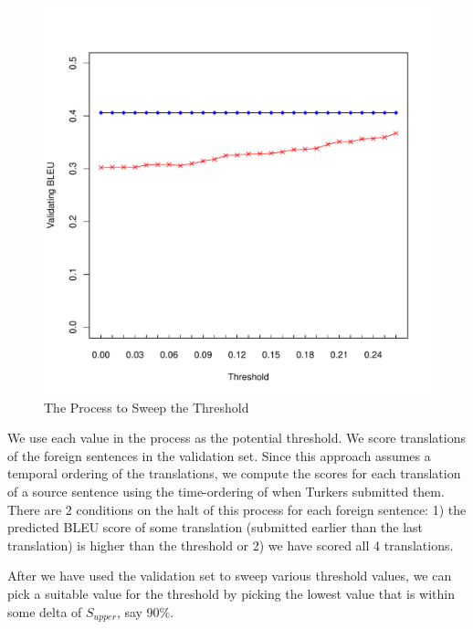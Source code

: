 \documentclass[11pt]{article}
\begin{document}
 \begin{figure}[htbp]
  \centering
  \includegraphics[width=\linewidth]{WorkerSelection/bleuthreshold.pdf}
  \caption{The Process to Sweep the Threshold}
    \label{fsweepthre}
\end{figure}

 We use each value  in the process  as the potential threshold.  We score translations of the foreign sentences in the validation set.  Since this approach assumes a temporal ordering of the translations, we compute the scores for each translation of a source sentence using the time-ordering of when Turkers submitted them. There are 2 conditions on the halt of this process for each foreign sentence: 1) the predicted BLEU score of some translation (submitted earlier than the last translation) is higher than the threshold or 2) we have scored all 4 translations.  


After we have used the validation set to sweep various threshold values,  we can pick a suitable value for the threshold by picking the lowest value that is within some delta of $S_{upper}$, say  90$\%$. 
\end{document}
